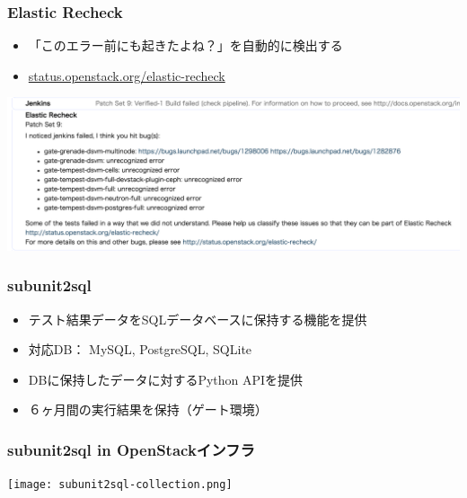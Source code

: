\documentclass[aspectratio=169,11pt,hyperref={colorlinks=true}]{beamer}
\begin{document}
\begin{frame}
  \frametitle{Elastic Recheck}
  \begin{itemize}
    \item 「このエラー前にも起きたよね？」を自動的に検出する
    \item \href{http://status.openstack.org/elastic-recheck/}{status.openstack.org/elastic-recheck}
  \end{itemize}
  \begin{center}
    \includegraphics[width=.9\textwidth]{elastic-recheck-sample.png}
  \end{center}
\end{frame}

\begin{frame}
  \frametitle{subunit2sql}
  \begin{itemize}
    \item テスト結果データをSQLデータベースに保持する機能を提供
    \item 対応DB： MySQL, PostgreSQL, SQLite
    \item DBに保持したデータに対するPython APIを提供
    \item ６ヶ月間の実行結果を保持（ゲート環境）
  \end{itemize}
\end{frame}

\begin{frame}
  \frametitle{subunit2sql in OpenStackインフラ}
  \begin{center}
    \texttt{[image: subunit2sql-collection.png]}
  \end{center}
\end{frame}
\end{document}
